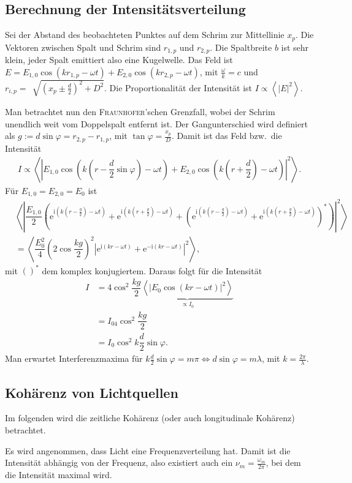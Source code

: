 \documentclass[a4paper,12pt]{article}
\numberwithin{equation}{section}
\begin{document}
\subsection{Berechnung der Intensitätsverteilung}
Sei der Abstand des beobachteten Punktes auf dem Schrim zur Mittellinie $x_p$.
Die Vektoren zwischen Spalt und Schrim sind $r_{1,p}$ und $r_{2,p}$.
Die Spaltbreite $b$ ist sehr klein, jeder Spalt emittiert also eine Kugelwelle.
Das Feld ist $E=E_{1,0}\cos \left(kr_{1,p}-\omega t\right)+E_{2,0}\cos \left(kr_{2,p}-\omega t\right)$, mit $\tfrac{\omega }{k}=c$ und $r_{i,p}=\,\sqrt[]{\left(x_p\pm \tfrac{d}{2}\right)^2+D^2}$.
Die Proportionalität der Intensität ist $I\propto \left\langle |E|^2\right\rangle $.\par
Man betrachtet nun den \textsc{Fraunhofer}'schen Grenzfall, wobei der Schrim unendlich weit vom Doppelspalt entfernt ist.
Der Gangunterschied wird definiert als $g:=d\sin \varphi =r_{2,p}-r_{1,p}$, mit $\tan \varphi =\tfrac{x_p}{D}$.
Damit ist das Feld bzw.\ die Intensität 
\begin{align} 
        I\propto \left\langle |E_{1,0}\cos \left(k\left(r-\dfrac{d}{2}\sin \varphi \right)-\omega t\right)+E_{2,0}\cos \left(k\left(r+\dfrac{d}{2}\right)-\omega t\right)|^2\right\rangle 
.\end{align} 
Für $E_{1,0}=E_{2,0}=E_0$ ist 
\begin{align} 
        &\left\langle \left|\dfrac{E_{1,0}}{2}\left(\text{e}^{\text{i}\left(k\left(r-\tfrac{g}{2}\right)-\omega t\right)}+\text{e}^{\text{i}\left(k\left(r+\tfrac{g}{2}\right)-\omega t\right)}+\left(\text{e}^{\text{i}\left(k\left(r-\tfrac{g}{2}\right)-\omega t\right)}+\text{e}^{\text{i}\left(k\left(r+\tfrac{g}{2}\right)-\omega t\right)}\right)^*\right)\right|^2\right\rangle \\
        &=\left\langle \dfrac{E_0^2}{4}\left(2\cos \dfrac{kg}{2}\right)^2\left|\text{e}^{\text{i}\left(kr-\omega t\right)}+\text{e}^{-\text{i}\left(kr-\omega t\right)}\right|^2\right\rangle 
,\end{align} 
mit $()^*$ dem komplex konjugiertem. Daraus folgt für die Intensität
\begin{align} 
        I&=4\cos ^2\dfrac{kg}{2}\underbrace{\left\langle \left|E_0\cos \left(kr-\omega t\right)\right|^2\right\rangle }_{\propto I_0}\\
         &=I_04\cos ^2\dfrac{kg}{2}\\
         &=I_0\cos ^2k\dfrac{d}{2}\sin \varphi
.\end{align} 
Man erwartet Interferenzmaxima für $k\tfrac{d}{2}\sin \varphi =m\pi \Leftrightarrow d\sin \varphi =m\lambda $, mit $k=\tfrac{2\pi }{\lambda }$.

\subsection{Kohärenz von Lichtquellen}
Im folgenden wird die zeitliche Kohärenz (oder auch longitudinale Kohärenz) betrachtet.\par
Es wird angenommen, dass Licht eine Frequenzverteilung hat. 
Damit ist die Intensität abhängig von der Frequenz, also existiert auch ein $\nu _m=\tfrac{\omega _m}{2\pi }$, bei dem die Intensität maximal wird.

\end{document}
